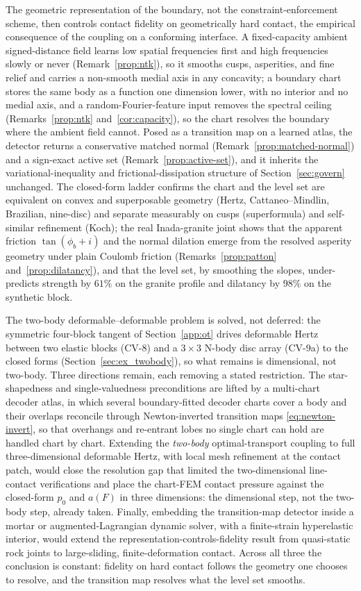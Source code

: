 \documentclass{svjour3}                 %
\begin{document}
The geometric representation of the boundary, not the constraint-enforcement scheme, then controls contact fidelity on
geometrically hard contact, the empirical consequence of the coupling on a conforming interface. A fixed-capacity ambient signed-distance field learns low spatial frequencies first
and high frequencies slowly or never (Remark~\ref{prop:ntk}), so it smooths cusps, asperities, and fine
relief and carries a non-smooth medial axis in any concavity; a boundary chart stores the same body as a function
one dimension lower, with no interior and no medial axis, and a random-Fourier-feature input removes the spectral
ceiling (Remarks~\ref{prop:ntk} and~\ref{cor:capacity}), so the chart resolves the boundary where the
ambient field cannot. Posed as a transition map on a learned atlas, the detector returns a conservative matched
normal (Remark~\ref{prop:matched-normal}) and a sign-exact active set (Remark~\ref{prop:active-set}),
and it inherits the variational-inequality and frictional-dissipation structure of Section~\ref{sec:govern}
unchanged. The closed-form ladder confirms the chart and the level set are equivalent on convex and superposable
geometry (Hertz, Cattaneo--Mindlin, Brazilian, nine-disc) and separate measurably on cusps (superformula) and
self-similar refinement (Koch); the real Inada-granite joint shows that the apparent friction $\tan(\phi_b+i)$ and the normal dilation emerge from
the resolved asperity geometry under plain Coulomb friction (Remarks~\ref{prop:patton}
and~\ref{prop:dilatancy}), and that the level set, by smoothing the slopes, under-predicts strength by $61\%$ on
the granite profile and dilatancy by $98\%$ on the synthetic block.

The two-body deformable--deformable problem is solved, not deferred: the symmetric four-block tangent of
Section~\ref{app:ot} drives deformable Hertz between two elastic blocks (CV-8) and a $3\times3$ N-body disc
array (CV-9a) to the closed forms (Section~\ref{sec:ex_twobody}), so what remains is dimensional, not
two-body. Three directions remain, each removing a stated restriction. The star-shapedness and single-valuedness
preconditions are lifted by a multi-chart decoder atlas, in which several boundary-fitted decoder charts cover a
body and their overlaps reconcile through Newton-inverted transition maps \eqref{eq:newton-invert}, so that
overhangs and re-entrant lobes no single chart can hold are handled chart by chart. Extending the \emph{two-body}
optimal-transport coupling to full three-dimensional deformable Hertz, with local mesh refinement at the contact
patch, would close the resolution gap that limited the two-dimensional line-contact verifications and place the
chart-FEM contact pressure against the closed-form $p_0$ and $a(F)$ in three dimensions: the dimensional step,
not the two-body step, already taken. Finally, embedding the transition-map detector inside a
mortar or augmented-Lagrangian dynamic solver, with a finite-strain hyperelastic interior, would extend the
representation-controls-fidelity result from quasi-static rock joints to large-sliding, finite-deformation
contact. Across all three the conclusion is constant: fidelity on hard contact follows the geometry one chooses
to resolve, and the transition map resolves what the level set smooths.
\end{document}
